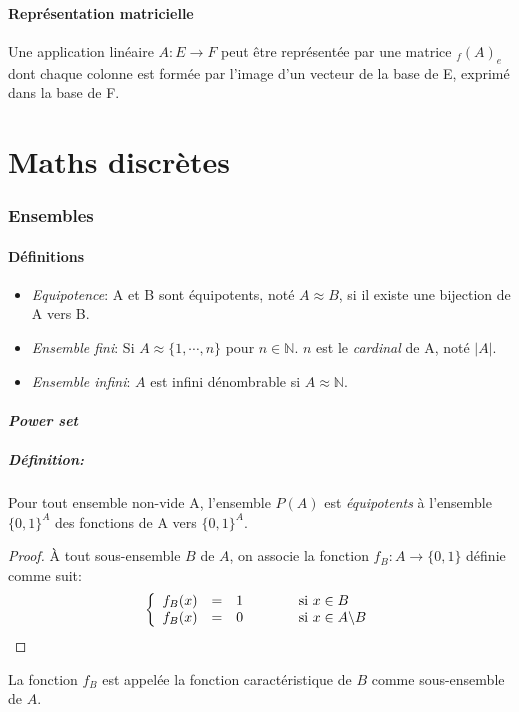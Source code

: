 \subsection{Représentation matricielle}
Une application linéaire $A : E \rightarrow F$ peut être représentée par une matrice $_f(A)_e$ dont chaque colonne est formée par l'image d'un vecteur de la base de E, exprimé dans la base de F.

\part{Maths discrètes}

\section{Ensembles}

\subsection{Définitions}
\begin{itemize}
  \item \emph{Equipotence}: A et B sont équipotents, noté $A\approx B$,
    si il existe une bijection de A vers B.
  \item \emph{Ensemble fini}:
    Si $A \approx \{1, \cdots , n\}$ pour $n \in \mathbb{N}$.
    $n$ est le \emph{cardinal} de A, noté $|A|$.
  \item \emph{Ensemble infini}:
    $A$ est infini dénombrable si $A \approx \mathbb{N}$.
\end{itemize}

\subsection{\emph{Power set}}
\subsubsection*{Définition:}
Pour tout ensemble non-vide A,
l'ensemble $P(A)$ est \emph{équipotents} à l'ensemble
$\{0, 1\}^{A}$ des fonctions de A vers $\{0, 1\}^{A}$.
\begin{proof}
  À tout sous-ensemble $B$ de $A$,
  on associe la fonction $f_B : A \rightarrow \{0, 1\}$ définie comme suit:
  \[
    \left \{
      \begin{array}{r c l}
        f_B(x) &=& 1 \qquad{\qquad} \text{si } x \in B\\
        f_B(x) &=& 0 \qquad{\qquad} \text{si } x \in A \backslash B
      \end{array}
    \right.
   \]
\end{proof}
La fonction $f_B$ est appelée la fonction caractéristique
de $B$ comme sous-ensemble de $A$.

